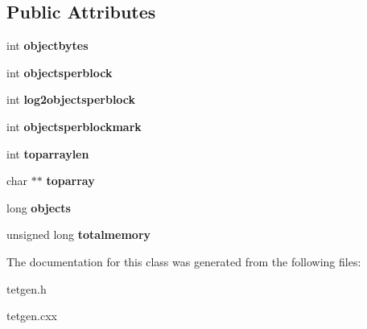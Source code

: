 \subsection*{Public Attributes}
\begin{DoxyCompactItemize}
\item 
\mbox{\label{classtetgenmesh_1_1arraypool_a469ac2a2833a25faa0f99ab011122e2d}} 
int {\bfseries objectbytes}
\item 
\mbox{\label{classtetgenmesh_1_1arraypool_a2b6ba46461d5c8f0e6043bdd111246dd}} 
int {\bfseries objectsperblock}
\item 
\mbox{\label{classtetgenmesh_1_1arraypool_ab61ada3b2fc49879a160a919e9994279}} 
int {\bfseries log2objectsperblock}
\item 
\mbox{\label{classtetgenmesh_1_1arraypool_a662031b2a9978bfc3be39ce90bd3bf0a}} 
int {\bfseries objectsperblockmark}
\item 
\mbox{\label{classtetgenmesh_1_1arraypool_aa9ced327d45678f31b4e7f8e75aff861}} 
int {\bfseries toparraylen}
\item 
\mbox{\label{classtetgenmesh_1_1arraypool_a3a4e28a88226f1dd777773fe45094650}} 
char $\ast$$\ast$ {\bfseries toparray}
\item 
\mbox{\label{classtetgenmesh_1_1arraypool_a23345232309fd68d2e3afa6d017299b0}} 
long {\bfseries objects}
\item 
\mbox{\label{classtetgenmesh_1_1arraypool_af264f265d5752e75f50adea472ecd59f}} 
unsigned long {\bfseries totalmemory}
\end{DoxyCompactItemize}


The documentation for this class was generated from the following files\+:\begin{DoxyCompactItemize}
\item 
tetgen.\+h\item 
tetgen.\+cxx\end{DoxyCompactItemize}
